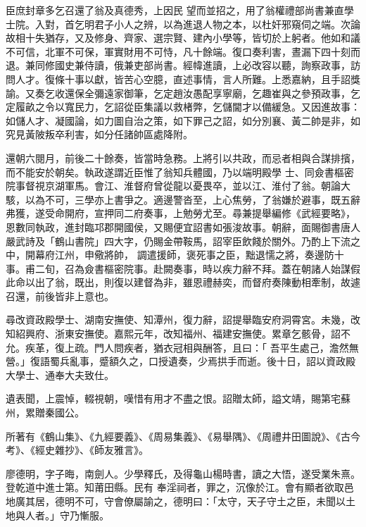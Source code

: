 \begin{pinyinscope}
 臣庶封章多乞召還了翁及真德秀，上因民
 望而並招之，用了翁權禮部尚書兼直學士院。入對，首乞明君子小人之辨，以為進退人物之本，以杜奸邪窺伺之端。次論故相十失猶存，又及修身、齊家、選宗賢、建內小學等，皆切於上躬者。他如和議不可信，北軍不可保，軍實財用不可恃，凡十餘端。復口奏利害，晝漏下四十刻而退。兼同修國史兼侍讀，俄兼吏部尚書。經幃進讀，上必改容以聽，詢察政事，訪問人才。復條十事以獻，皆苦心空臆，直述事情，言人所難。上悉嘉納，且手詔獎
 諭。又奏乞收還保全彌遠家御筆，乞定趙汝愚配享寧廟，乞趣崔與之參預政事，乞定履畝之令以寬民力，乞詔從臣集議以救楮弊，乞儲閫才以備緩急。又因進故事：如儲人才、凝國論，如力圖自治之策，如下罪己之詔，如分別襄、黃二帥是非，如究見黃陂叛卒利害，如分任諸帥區處降附。



 還朝六閱月，前後二十餘奏，皆當時急務。上將引以共政，而忌者相與合謀排擯，而不能安於朝矣。執政遂謂近臣惟了翁知兵體國，乃以端明殿學
 士、同僉書樞密院事督視京湖軍馬。會江、淮督府曾從龍以憂畏卒，並以江、淮付了翁。朝論大駭，以為不可，三學亦上書爭之。適邊警沓至，上心焦勞，了翁嫌於避事，既五辭弗獲，遂受命開府，宣押同二府奏事，上勉勞尤至。尋兼提舉編修《武經要略》，恩數同執政，進封臨邛郡開國侯，又賜便宜詔書如張浚故事。朝辭，面賜御書唐人嚴武詩及「鶴山書院」四大字，仍賜金帶鞍馬，詔宰臣飲餞於關外。乃酌上下流之中，開幕府江州，申儆將帥，
 調遣援師，褒死事之臣，黜退懦之將，奏邊防十事。甫二旬，召為僉書樞密院事。赴闕奏事，時以疾力辭不拜。蓋在朝諸人始謀假此命以出了翁，既出，則復以建督為非，雖恩禮赫奕，而督府奏陳動相牽制，故遽召還，前後皆非上意也。



 尋改資政殿學士、湖南安撫使、知潭州，復力辭，詔提舉臨安府洞霄宮。未幾，改知紹興府、浙東安撫使。嘉熙元年，改知福州、福建安撫使。累章乞骸骨，詔不允。疾革，復上疏。門人問疾者，猶衣冠相與酬答，且曰：「
 吾平生處己，澹然無營。」復語蜀兵亂事，蹙額久之，口授遺奏，少焉拱手而逝。後十日，詔以資政殿大學士、通奉大夫致仕。



 遺表聞，上震悼，輟視朝，嘆惜有用才不盡之恨。詔贈太師，謚文靖，賜第宅蘇州，累贈秦國公。



 所著有《鶴山集》、《九經要義》、《周易集義》、《易舉隅》、《周禮井田圖說》、《古今考》、《經史雜抄》、《師友雅言》。



 廖德明，字子晦，南劍人。少學釋氏，及得龜山楊時書，讀之大悟，遂受業朱熹。登乾道中進士第。知莆田縣。民有
 奉淫祠者，罪之，沉像於江。會有顯者欲取邑地廣其居，德明不可，守會僚屬諭之，德明曰：「太守，天子守土之臣，未聞以土地與人者。」守乃慚服。




\end{pinyinscope}
